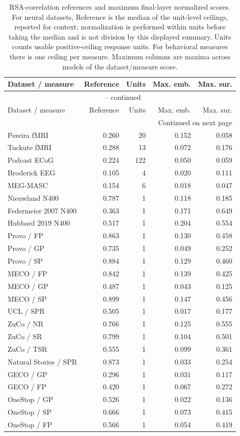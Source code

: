 {\small\setlength{\tabcolsep}{4pt}
\begin{longtable}{@{}lrrrr@{}}
\caption{RSA-correlation references and maximum final-layer normalized scores. For neural datasets, Reference is the median of the unit-level ceilings, reported for context; normalization is performed within units before taking the median and is not division by this displayed summary. Units counts usable positive-ceiling response units. For behavioral measures there is one ceiling per measure. Maximum columns are maxima across models of the dataset/measure score.}\label{tab:rsa-ceilings} \\
\toprule
Dataset / measure & Reference & Units & Max. emb. & Max. sur. \\
\midrule
\endfirsthead
\multicolumn{5}{c}{\tablename\ \thetable{} -- continued} \\
\toprule
Dataset / measure & Reference & Units & Max. emb. & Max. sur. \\
\midrule
\endhead
\midrule\multicolumn{5}{r}{Continued on next page} \\
\endfoot
\bottomrule
\endlastfoot
Pereira fMRI & 0.260 & 20 & 0.152 & 0.058 \\
Tuckute fMRI & 0.288 & 13 & 0.072 & 0.176 \\
Podcast ECoG & 0.224 & 122 & 0.050 & 0.059 \\
Broderick EEG & 0.105 & 4 & 0.020 & 0.111 \\
MEG-MASC & 0.154 & 6 & 0.018 & 0.047 \\
Nieuwland N400 & 0.787 & 1 & 0.118 & 0.185 \\
Federmeier 2007 N400 & 0.363 & 1 & 0.171 & 0.649 \\
Hubbard 2019 N400 & 0.517 & 1 & 0.204 & 0.554 \\
Provo / FP & 0.863 & 1 & 0.130 & 0.458 \\
Provo / GP & 0.735 & 1 & 0.049 & 0.252 \\
Provo / SP & 0.884 & 1 & 0.129 & 0.460 \\
MECO / FP & 0.842 & 1 & 0.139 & 0.425 \\
MECO / GP & 0.487 & 1 & 0.043 & 0.125 \\
MECO / SP & 0.899 & 1 & 0.147 & 0.456 \\
UCL / SPR & 0.505 & 1 & 0.017 & 0.177 \\
ZuCo / NR & 0.766 & 1 & 0.125 & 0.555 \\
ZuCo / SR & 0.799 & 1 & 0.104 & 0.501 \\
ZuCo / TSR & 0.555 & 1 & 0.099 & 0.361 \\
Natural Stories / SPR & 0.873 & 1 & 0.033 & 0.254 \\
GECO / GP & 0.296 & 1 & 0.031 & 0.117 \\
GECO / FP & 0.420 & 1 & 0.067 & 0.272 \\
OneStop / GP & 0.526 & 1 & 0.022 & 0.136 \\
OneStop / SP & 0.666 & 1 & 0.073 & 0.415 \\
OneStop / FP & 0.566 & 1 & 0.054 & 0.419 \\
\end{longtable}
}
